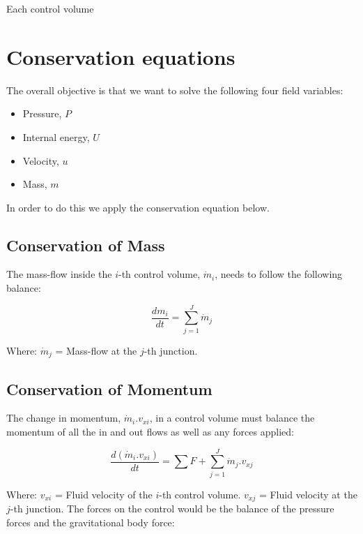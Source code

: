 \documentclass[11pt,letterpaper,titlepage]{article}
\begin{document}
Each control volume

\newpage
{}
\section{Conservation equations}
The overall objective is that we want to solve the following four field variables:
\begin{itemize}
\item Pressure, $P$
\item Internal energy, $U$
\item Velocity, $u$
\item Mass, $m$
\end{itemize}

\vspace{0.25cm}
\noindent
In order to do this we apply the conservation equation below.
\vspace{0.5cm}

\subsection{Conservation of Mass}
The mass-flow inside the $i$-th control volume, $\dot{m}_i$, needs to follow the following balance:

\begin{equation}
\frac{dm_i}{dt}=\sum_{j=1}^{J} \dot{m}_j
\end{equation}

\noindent 
Where: 
\newline \noindent $\dot{m}_j$ \quad = Mass-flow at the $j$-th junction.

\subsection{Conservation of Momentum}
The change in momentum, $\dot{m}_i.v_{xi}$, in a control volume must balance the momentum of all the in and out flows as well as any forces applied:

\begin{equation*}
\frac{d(\dot{m}_i.v_{xi})}{dt}=\sum F+\sum_{j=1}^{J} \dot{m}_j.v_{xj}
\end{equation*}

\noindent 
Where: 
\newline \noindent $v_{xi}$ \quad = Fluid velocity of the $i$-th control volume.
\newline \noindent $v_{xj}$ \quad = Fluid velocity at the $j$-th junction.
\newline
\newline
\noindent The forces on the control would be the balance of the pressure forces and the gravitational body force:
\end{document}
